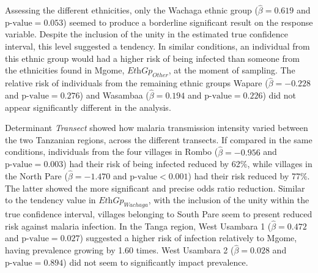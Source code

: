 Assessing the different ethnicities, only the Wachaga ethnic group ($\hat{\beta}=0.619$ and $\text{p-value}=0.053$) seemed to produce a borderline significant result on the response variable.
Despite the inclusion of the unity in the estimated true confidence interval, this level suggested a tendency.
In similar conditions, an individual from this ethnic group would had a higher risk of being infected than someone from the ethnicities found in Mgome, $\textit{EthGp}_{Other}$, at the moment of sampling.
The relative risk of individuals from the remaining ethnic groups Wapare ($\hat{\beta}=-0.228$ and $\text{p-value}=0.276$) and Wasambaa ($\hat{\beta}=0.194$ and $\text{p-value}=0.226$) did not appear significantly different in the analysis.

Determinant \textit{Transect} showed how malaria transmission intensity varied between the two Tanzanian regions, across the different transects.
If compared in the same conditions, individuals from the four villages in Rombo ($\hat{\beta}=-0.956$ and $\text{p-value}=0.003$) had their risk of being infected reduced by 62\%, while villages in the North Pare ($\hat{\beta}=-1.470$ and $\text{p-value}<0.001$) had their risk reduced by 77\%.
The latter showed the more significant and precise odds ratio reduction.
Similar to the tendency value in $\textit{EthGp}_{Wachaga}$, with the inclusion of the unity within the true confidence interval, villages belonging to South Pare seem to present reduced risk against malaria infection.
In the Tanga region, West Usambara 1 ($\hat{\beta}=0.472$ and $\text{p-value}=0.027$) suggested a higher risk of infection relatively to Mgome, having prevalence growing by 1.60 times.
West Usambara 2 ($\hat{\beta}=0.028$ and $\text{p-value}=0.894$) did not seem to significantly impact prevalence.

